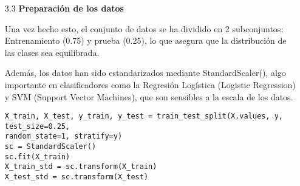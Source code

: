 \documentclass{article}
\begin{document}
\bigskip

\begin{itemize}

\item[3.3]  {\bf Preparaci\'on de los datos}

Una vez hecho esto, el conjunto de datos se ha dividido en 2 subconjuntos: Entrenamiento (0.75) y prueba (0.25), lo que asegura que la distribuci\'on de las clases sea equilibrada.

Adem\'as, los datos han sido estandarizados mediante StandardScaler(), algo importante en clasificadores como la Regresi\'on Log\'istica (Logistic Regression) y SVM (Support Vector Machines), que son sensibles a la escala de los datos.

\begin{tcolorbox}[width=14cm]
\begin{scriptsize}
\begin{verbatim}
X_train, X_test, y_train, y_test = train_test_split(X.values, y, test_size=0.25,
random_state=1, stratify=y)
sc = StandardScaler()
sc.fit(X_train)
X_train_std = sc.transform(X_train)
X_test_std = sc.transform(X_test)
\end{verbatim}
\end{scriptsize}
\end{tcolorbox}

\end{itemize}

\newpage
\end{document}
